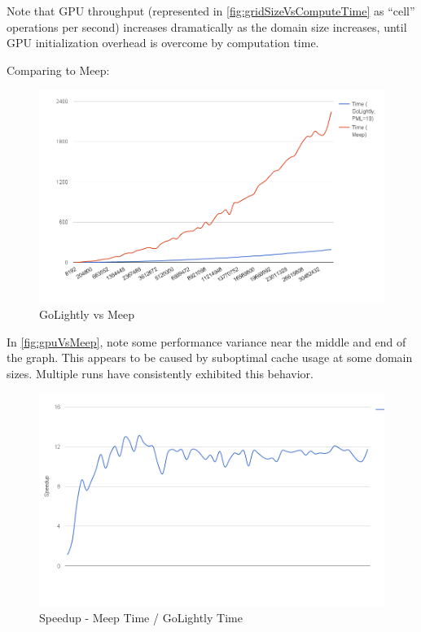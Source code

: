 Note that GPU throughput (represented in \autoref{fig:gridSizeVsComputeTime} as “cell” operations per second) increases dramatically as the domain size increases, until GPU initialization overhead is overcome by computation time.

Comparing to Meep:

\begin{figure}[H]
	\centering
	\includegraphics[width=\textwidth,
	keepaspectratio]{gpu-vs-meep.png}
	\caption{GoLightly vs Meep}
	\label{fig:gpuVsMeep}
\end{figure}

In \autoref{fig:gpuVsMeep}, note some performance variance near the middle and end of the graph. This appears to be caused by suboptimal cache usage at some domain sizes. Multiple runs have consistently exhibited this behavior.

\begin{figure}[H]
	\centering
	\includegraphics[width=\textwidth,
	keepaspectratio]{gpu-vs-meep-speedup.png}
	\caption{Speedup - Meep Time / GoLightly Time}
	\label{fig:gpuVsMeepSpeedup}
\end{figure}

